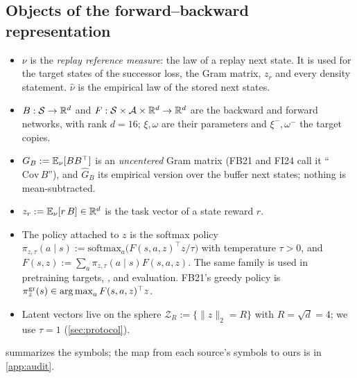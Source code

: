 \subsection{Objects of the forward--backward representation}

\begin{itemize}[nosep]
\item $\nu$ is the \emph{replay reference measure}: the law of a replay next state. It is used for the target states of the successor loss, the Gram matrix, $z_r$ and every density statement. $\hat\nu$ is the empirical law of the stored next states.
\item $B:\mathcal{S}\to\mathbb{R}^d$ and $F:\mathcal{S}\times\mathcal{A}\times\mathbb{R}^d\to\mathbb{R}^d$ are the backward and forward networks, with rank $d=16$; $\xi,\omega$ are their parameters and $\xi^-,\omega^-$ the target copies.
\item $G_B:=\mathbb{E}_\nu[BB^\top]$ is an \emph{uncentered} Gram matrix (FB21 and FI24 call it ``$\mathrm{Cov}\,B$''), and $\hat G_B$ its empirical version over the buffer next states; nothing is mean-subtracted.
\item $z_r:=\mathbb{E}_\nu[r\,B]\in\mathbb{R}^d$ is the task vector of a state reward $r$.
\item The policy attached to $z$ is the softmax policy $\pi_{z,\tau}(a\mid s):=\mathrm{softmax}_a\big(F(s,a,z)^\top z/\tau\big)$ with temperature $\tau>0$, and $F(s,z):=\sum_a\pi_{z,\tau}(a\mid s)F(s,a,z)$. The same family is used in pretraining targets, \ERFB, \DMFB{} and evaluation. FB21's greedy policy is $\pi^{\mathrm{gr}}_z(s)\in\operatorname*{arg\,max}_aF(s,a,z)^\top z$.
\item Latent vectors live on the sphere $\mathcal Z_R:=\{\lVert z\rVert_2=R\}$ with $R=\sqrt d=4$; we use $\tau=1$ (\cref{sec:protocol}).
\end{itemize}

 summarizes the symbols; the map from each source's symbols to ours is in \cref{app:audit}.


